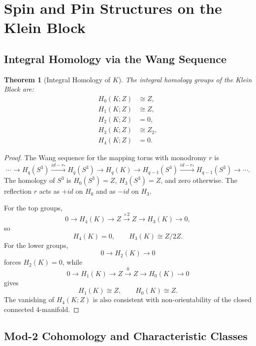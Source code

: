 \documentclass[11pt]{article}
\theoremstyle{canonmath}
\newtheorem{theorem}{Theorem}[section]
\theoremstyle{canonpostulate}
\theoremstyle{canonproposition}
\providecommand{\Klein}{\mathcal{K}}
\providecommand{\Z}{\mathbb{Z}}
\providecommand{\Ztwo}{\mathbb{Z}_2}
\providecommand{\Sthree}{S^3}
\providecommand{\id}{\mathrm{id}}
\def\mathrm#1{#1}%
\def\mathbb#1{#1}%
\def\mathcal#1{#1}%
\begin{document}
\section{Spin and Pin Structures on the Klein Block}

\subsection{Integral Homology via the Wang Sequence}

\begin{theorem}[Integral Homology of $\Klein$] \label{thm:homology}
The integral homology groups of the Klein Block are:
\begin{align}
    H_0(\Klein;\Z)&\cong\Z, \nonumber \\
    H_1(\Klein;\Z)&\cong\Z, \nonumber \\
    H_2(\Klein;\Z)&=0, \nonumber \\
    H_3(\Klein;\Z)&\cong\Ztwo, \nonumber \\
    H_4(\Klein;\Z)&=0.
\end{align}
\end{theorem}
\begin{proof}
The Wang sequence for the mapping torus with monodromy $r$ is
\begin{equation}
    \cdots\to H_q(\Sthree)
    \xrightarrow{\id-r_*}
    H_q(\Sthree)
    \to H_q(\Klein)
    \to H_{q-1}(\Sthree)
    \xrightarrow{\id-r_*}
    H_{q-1}(\Sthree)\to\cdots.
\end{equation}
The homology of $\Sthree$ is $H_0(\Sthree)=\Z$, $H_3(\Sthree)=\Z$, and zero otherwise. The reflection $r$ acts as $+\id$ on $H_0$ and as $-\id$ on $H_3$.

For the top groups,
\[
0\to H_4(\Klein)\to\Z\xrightarrow{\times2}\Z\to H_3(\Klein)\to0,
\]
so
\[
H_4(\Klein)=0,
\qquad
H_3(\Klein)\cong\Z/2\Z.
\]
For the lower groups,
\[
0\to H_2(\Klein)\to0
\]
forces $H_2(\Klein)=0$, while
\[
0\to H_1(\Klein)\to\Z\xrightarrow{0}\Z\to H_0(\Klein)\to0
\]
gives
\[
H_1(\Klein)\cong\Z,
\qquad
H_0(\Klein)\cong\Z.
\]
The vanishing of $H_4(\Klein;\Z)$ is also consistent with non-orientability of the closed connected 4-manifold.
\end{proof}

\subsection{Mod-2 Cohomology and Characteristic Classes}
\end{document}
